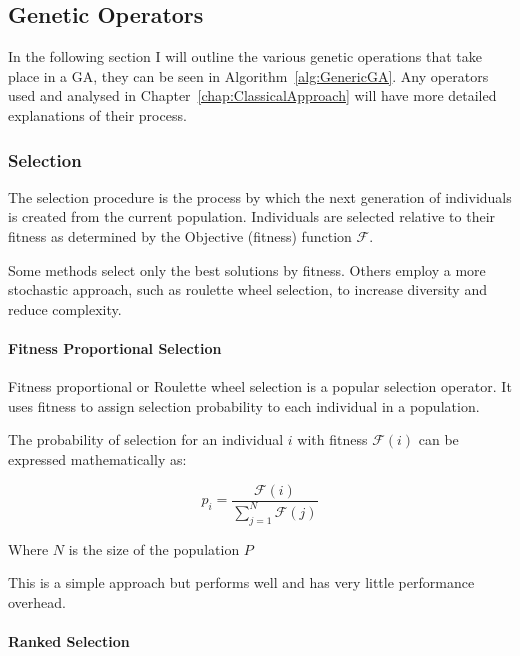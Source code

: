 \subsection{Genetic Operators}

In the following section I will outline the various genetic operations that take place in a GA, they can be seen in Algorithm~\ref{alg:GenericGA}. Any operators used and analysed in Chapter~\ref{chap:ClassicalApproach} will have more detailed explanations of their process.

\subsubsection{Selection}

The selection procedure is the process by which the next generation of individuals is created from the current population. Individuals are selected relative to their fitness as determined by the Objective (fitness) function $\mathcal{F}$. 

Some methods select only the best solutions by fitness. Others employ a more stochastic approach, such as roulette wheel selection, to increase diversity and reduce complexity.

\paragraph{Fitness Proportional Selection}\label{imp:FitPropSel}

Fitness proportional or Roulette wheel selection is a popular selection operator. It uses fitness to assign selection probability to each individual in a population.

The probability of selection for an individual $i$ with fitness $\mathcal{F}(i)$ can be expressed mathematically as:

\begin{equation}
    p_i = \frac{\mathcal{F}(i)}{ \sum^{N}_{j=1} \mathcal{F}(j)} 
\end{equation}

Where $N$ is the size of the population $P$

This is a simple approach but performs well and has very little performance overhead.

\paragraph{Ranked Selection}\label{imp:RankSel}

